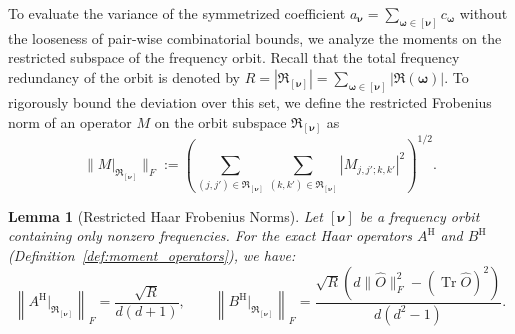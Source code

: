 \documentclass[%
 reprint,
 amsmath,amssymb,
 aps,
 pra,
]{revtex4-2}
\newtheorem{lemma}[theorem]{Lemma}
\theoremstyle{definition}
\begin{document}
To evaluate the variance of the symmetrized coefficient $a_{\bm{\nu}} = \sum_{\bm{\omega}\in[\bm{\nu}]} c_{\bm{\omega}}$ without the looseness of pair-wise combinatorial bounds, we analyze the moments on the restricted subspace of the frequency orbit. Recall that the total frequency redundancy of the orbit is denoted by $R = |\mathfrak{R}_{[\bm{\nu}]}| = \sum_{\bm{\omega}\in[\bm{\nu}]} |\mathfrak{R}(\bm{\omega})|$. To rigorously bound the deviation over this set, we define the restricted Frobenius norm of an operator $M$ on the orbit subspace $\mathfrak{R}_{[\bm{\nu}]}$ as
\begin{equation}
\| M |_{\mathfrak{R}_{[\bm{\nu}]}} \|_F := \left(\sum_{(j,j') \in \mathfrak{R}_{[\bm{\nu}]}} \sum_{(k,k') \in \mathfrak{R}_{[\bm{\nu}]}} |M_{j,j';k,k'}|^2\right)^{1/2}.
\end{equation}

\begin{lemma}[Restricted Haar Frobenius Norms]
\label{lemma:restricted_haar_norm}
Let $[\bm{\nu}]$ be a frequency orbit containing only nonzero frequencies. For the exact Haar operators $A^{\mathrm{H}}$ and $B^{\mathrm{H}}$ (Definition~\ref{def:moment_operators}), we have:
\begin{equation}
\left\| A^{\mathrm{H}} |_{\mathfrak{R}_{[\bm{\nu}]}} \right\|_F = \frac{\sqrt{R}}{d(d+1)}, \qquad
\left\| B^{\mathrm{H}} |_{\mathfrak{R}_{[\bm{\nu}]}} \right\|_F = \frac{ \sqrt{R}(d\|\hat{O}\|_F^2-(\operatorname{Tr} \hat{O})^2)}{d\left(d^2-1\right)}.
\end{equation}
\end{lemma}
\end{document}

